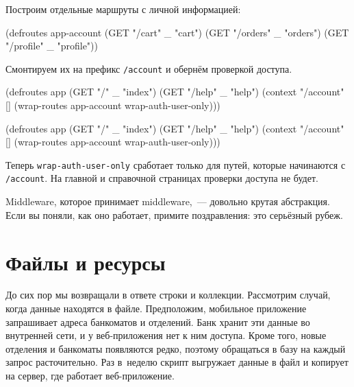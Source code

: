 Построим отдельные маршруты с личной информацией:

\begin{english}
  \begin{clojure}
(defroutes app-account
  (GET "/cart"    _ "cart")
  (GET "/orders"  _ "orders")
  (GET "/profile" _ "profile"))
  \end{clojure}
\end{english}

\noindent
Смонтируем их на префикс \verb|/account| и обернём проверкой доступа.

\ifnarrow

\begin{english}
  \begin{clojure}
(defroutes app
  (GET "/"     _ "index")
  (GET "/help" _ "help")
  (context "/account" []
    (wrap-routes app-account
                 wrap-auth-user-only)))
  \end{clojure}
\end{english}

\else

\begin{english}
  \begin{clojure}
(defroutes app
  (GET "/"     _ "index")
  (GET "/help" _ "help")
  (context "/account" []
    (wrap-routes app-account wrap-auth-user-only)))
  \end{clojure}
\end{english}

\fi


Теперь \verb|wrap-auth-user-only| сработает только для путей, которые
начинаются с \verb|/account|. На главной и справочной страницах проверки
доступа не будет.

Middleware, которое принимает middleware,~--- довольно крутая абстракция. Если вы
поняли, как оно работает, примите поздравления: это серьёзный рубеж.

\section{Файлы и ресурсы}

\label{http-files}

До сих пор мы возвращали в ответе строки и коллекции. Рассмотрим случай, когда
данные находятся в файле. Предположим, мобильное приложение запрашивает адреса
банкоматов и отделений. Банк хранит эти данные во внутренней сети, и у
веб-приложения нет к ним доступа. Кроме того, новые отделения и банкоматы
появляются редко, поэтому обращаться в базу на каждый запрос расточительно. Раз
в~неделю скрипт выгружает данные в файл и копирует на сервер, где работает
веб-приложение.


